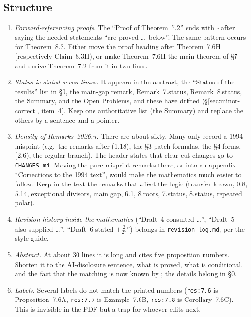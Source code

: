 \documentclass[12pt,letterpaper]{amsart}
\begin{document}
\subsection{Structure}

\begin{enumerate}
\item \emph{Forward-referencing proofs.} The ``Proof of Theorem~7.2'' ends with
$\square$ after saying the needed statements ``are proved \dots\ below''. The
same pattern occurs for Theorem~8.3. Either move the proof heading after
Theorem~7.6H (respectively Claim~8.3H), or make Theorem~7.6H the main theorem
of \S7 and derive Theorem~7.2 from it in two lines.
\item \emph{Status is stated seven times.} It appears in the abstract, the
``Status of the results'' list in \S0, the main-gap remark, Remark~7.status,
Remark~8.status, the Summary, and the Open Problems, and these have drifted
(\S\ref{sec:minor-correct}, item~4). Keep one authoritative list (the Summary)
and replace the others by a sentence and a pointer.
\item \emph{Density of Remarks~2026.n.} There are about sixty. Many only
record a 1994 misprint (e.g.\ the remarks after (1.18), the
\S3 patch formulas, the \S4 forms, (2.6), the regular branch).
The header states that clear-cut changes go to \texttt{CHANGES.md}. Moving the
pure-misprint remarks there, or into an appendix ``Corrections to the 1994
text'', would make the mathematics much easier to follow. Keep in the text
the remarks that affect the logic (transfer known, 0.8, 5.14, exceptional
divisors, main gap, 6.1, 8.roots, 7.status, 8.status, repeated polar).
\item \emph{Revision history inside the mathematics} (``Draft~4 consulted
\dots'', ``Draft~5 also supplied \dots'', ``Draft~6 stated $\pm\frac{2}{27}$'')
belongs in \texttt{revision\_log.md}, per the style guide.
\item \emph{Abstract.} At about 30 lines it is long and cites five
proposition numbers. Shorten it to the AI-disclosure sentence, what is proved,
what is conditional, and the fact that the matching is now known by
\cite{GH16}; the details belong in \S0.
\item \emph{Labels.} Several labels do not match the printed numbers
(\texttt{res:7.6} is Proposition~7.6A, \texttt{res:7.7} is Example~7.6B,
\texttt{res:7.8} is Corollary~7.6C). This is invisible in the PDF but a trap
for whoever edits next.
\end{enumerate}
\end{document}
